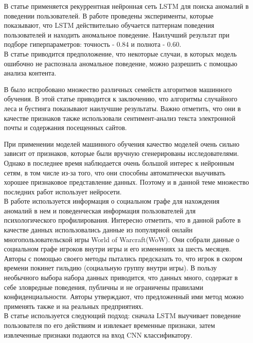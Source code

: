 В статье \cite{luInsiderThreatDetection2019} применяется рекуррентная нейронная сеть LSTM для поиска аномалий в поведении пользователей. В работе проведены эксперименты, которые показывают, что LSTM действительно обучается паттернам поведения пользователей и находить аномальное поведение. Наилучший результат при подборе гиперпараметров: точность - $0.84$ и полнота - $0.60$.\\
В статье приводится предположение, что некоторые случаи, в которых модель ошибочно не распознала аномальное поведение, можно разрешить с помощью анализа контента.

В \cite{noeverClassifierSuitesInsider2019} было испробовано множество различных семейств алгоритмов машинного обучения. В этой статье приводится к заключению, что алгоритмы случайного леса и бустинга показывают наилучшие результаты. Важно отметить, что они в качестве признаков также использовали сентимент-анализ текста электронной почты и содержания посещенных сайтов.

При применении моделей машинного обучения качество моделей очень сильно зависит от признаков, которые были вручную сгенерированы исследователями. Однако в последнее время наблюдается очень большой интерес к нейронным сетям, в том числе из-за того, что они способны автоматически выучивать хорошее признаковое представление данных. Поэтому и в данной теме множество последних работ использует нейросети.\\

В работе \cite{brdiczkaProactiveInsiderThreat2012b} используется информация о социальном графе для нахождения аномалий в нем и поведенческая информация пользователей для психологического профилирования. Интересно отметить, что в данной работе в качестве данных использовались данные из популярной онлайн многопользовательской игры World of Warcraft(WoW). Они собрали данные о социальном графе игроков внутри игры и его изменениях за шесть месяцев. Авторы с помощью своего методы пытались предсказать то, что игрок в скором времени покинет гильдию (социальную группу внутри игры). В пользу необычного выбора набора данных приводится, что данных много, содержат в себе зловредные поведения, публичны и не ограничены правилами конфиденциальности. Авторы утверждают, что предложенный ими метод можно применять также и на реальных предприятиях.\\

В статье \cite{yuanInsiderThreatDetection2018b} используется следующий подход: сначала LSTM выучивает поведение пользователя по его действиям и извлекает временные признаки, затем извлеченные признаки подаются на вход CNN классификатору.\\

